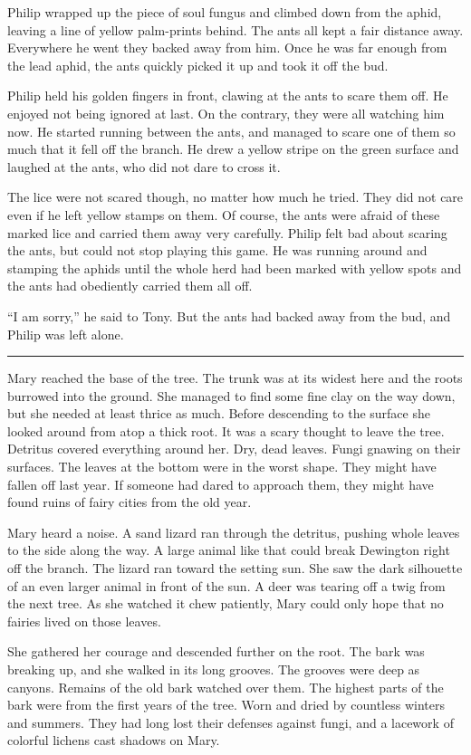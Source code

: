\documentclass[10pt, draft]{memoir}
\renewcommand{\pfbreakdisplay}{\bigskip \ding{166} \bigskip}
\newcommand{\secbreak}{\fancybreak{\pfbreakdisplay}}
\begin{document}
Philip wrapped up the piece of soul fungus and climbed down from the aphid,
leaving a line of yellow palm-prints behind. The ants all kept a fair distance
away. Everywhere he went they backed away from him. Once he was far enough from
the lead aphid, the ants quickly picked it up and took it off the bud.

Philip held his golden fingers in front, clawing at the ants to scare them off.
He enjoyed not being ignored at last. On the contrary, they were all watching
him now. He started running between the ants, and managed to scare one of them
so much that it fell off the branch. He drew a yellow stripe on the green
surface and laughed at the ants, who did not dare to cross it.

The lice were not scared though, no matter how much he tried. They did not
care even if he left yellow stamps on them. Of course, the ants were afraid of
these marked lice and carried them away very carefully. Philip felt bad about
scaring the ants, but could not stop playing this game. He was running around
and stamping the aphids until the whole herd had been marked with yellow spots
and the ants had obediently carried them all off.

``I am sorry,'' he said to Tony. But the ants had backed away from the bud, and
Philip was left alone.

\secbreak

Mary reached the base of the tree. The trunk was at its widest here and the
roots burrowed into the ground. She managed to find some fine clay on the way
down, but she needed at least thrice as much. Before descending to the surface
she looked around from atop a thick root. It was a scary thought to leave the
tree. Detritus covered everything around her. Dry, dead leaves. Fungi gnawing
on their surfaces. The leaves at the bottom were in the worst shape. They might
have fallen off last year. If someone had dared to approach them, they might
have found ruins of fairy cities from the old year.

Mary heard a noise. A sand lizard ran through the detritus, pushing whole
leaves to the side along the way. A large animal like that could break
Dewington right off the branch. The lizard ran toward the setting sun. She saw
the dark silhouette of an even larger animal in front of the sun. A deer was
tearing off a twig from the next tree. As she watched it chew patiently, Mary
could only hope that no fairies lived on those leaves.

She gathered her courage and descended further on the root. The bark was
breaking up, and she walked in its long grooves. The grooves were deep as
canyons. Remains of the old bark watched over them. The highest parts of the
bark were from the first years of the tree. Worn and dried by countless winters
and summers. They had long lost their defenses against fungi, and a lacework of
colorful lichens cast shadows on Mary.
\end{document}

